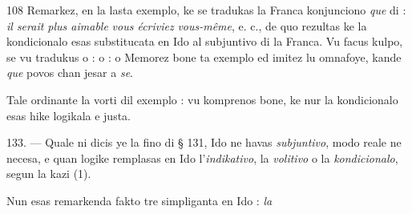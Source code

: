 \begin{VUpage}[112]{108}
Remarkez, en la lasta exemplo, ke se tradukas la Franca\nl
konjunciono \textit{que} di : \textit{il serait plus aimable}  \textit{vous écriviez}\nl
\textit{vous-même}, e. c., de quo rezultas ke la kondicionalo esas\nl
substitucata en Ido al subjuntivo di la Franca. Vu facus\nl
kulpo, se vu tradukus o : \nl
o :  o  Memorez bone\nl
ta exemplo ed imitez lu omnafoye, kande \textit{que} povos chan\cc
jesar a \textit{se}.

Tale ordinante la vorti dil exemplo : \nl
{} vu komprenos bone,\nl
ke nur la kondicionalo esas hike logikala e justa.

\VUblanc{5.88pt}%
133. --- Quale ni dicis ye la fino di § 131, Ido ne havas\nl
\textit{subjuntivo}, modo reale ne necesa, e quan logike remplasas\nl
en Ido l'\textit{indikativo}, la \textit{volitivo} o la \textit{kondicionalo}, segun la\nl
kazi (1).

Nun esas remarkenda fakto tre simpliganta en Ido : \textit{la}\parplein
\end{VUpage}

